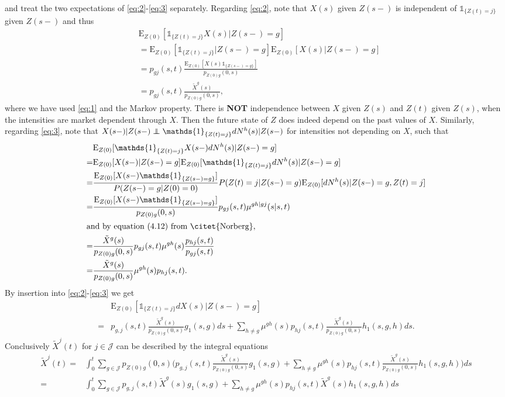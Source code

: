 \documentclass[12pt]{article}
\newcommand{\E}{\text{E}}
\newcommand{\indic}[1]{\mathds{1}_{ \{ #1 \} }}
\newcommand\independent{\protect\mathpalette{\protect\independenT}{\perp}}
\def\independenT#1#2{\mathrel{\rlap{$#1#2$}\mkern2mu{#1#2}}}
\begin{document}
and treat the two expectations of \eqref{eq:2}-\eqref{eq:3} separately. Regarding \eqref{eq:2}, note that $X(s)$ given $Z(s-)$ is independent of $\indic{Z(t)=j}$ given $Z(s-)$ and thus
\begin{align}
&\E_{Z(0)}[\indic{Z(t)=j}X(s)|Z(s-)=g] \nonumber
\\
&=\E_{Z(0)}[\indic{Z(t)=j}|Z(s-)=g] \E_{Z(0)}[ X(s)|Z(s-)=g] \label{eq:AAA}
\\
&=p_{gj}(s,t) \frac{\E_{Z(0)}[X(s)\indic{Z(s-)=g}]}{p_{Z(0)g}(0,s)} \nonumber
\\
&=p_{gj}(s,t) \frac{\tilde{X}^g(s)}{p_{Z(0)g}(0,s)} \nonumber,
\end{align}
where we have used \eqref{eq:1} and the Markov property. There is \textbf{NOT} independence between $X$ given $Z(s)$ and $Z(t)$ given $Z(s)$, when the intensities are market dependent through $X$. Then the future state of $Z$ does indeed depend on the past values of $X$. Similarly, regarding \eqref{eq:3}, note that $X(s-)|Z(s-) \independent \indic{Z(t)=j}dN^h(s)|Z(s-	)$ for intensities not depending on $X$, such that 
\begin{align}
&\E_{Z(0)}[ \indic{Z(t)=j}   X(s-) dN^h(s)|Z(s-)=g] \nonumber
\\
=&  \E_{Z(0)}[ X(s-) |Z(s-)=g] \E_{Z(0)}[ \indic{Z(t)=j} dN^h(s)|Z(s-)=g] \label{eq:AAB}
\\
=&
\frac{\E_{Z(0)}[ X(s-) \indic{Z(s-)=g}]}{P(Z(s-)=g|Z(0)=0)}P(Z(t)=j|Z(s-)=g)\E_{Z(0)}[dN^h(s)|Z(s-)=g,Z(t)=j] \nonumber
\\
=&
\frac{\E_{Z(0)}[ X(s-) \indic{Z(s-)=g}]}{p_{Z(0)g}(0,s)}p_{gj}(s,t) \mu^{gh|gj}(s|s,t)\nonumber
\\
\intertext{and by equation (4.12) from \citet{Norberg},}
=&
\frac{\tilde{X}^g(s)}{p_{Z(0)g}(0,s)}p_{gj}(s,t) \mu^{gh}(s)\frac{p_{hj}(s,t)}{p_{gj}(s,t)} \nonumber
\\
=&
\frac{\tilde{X}^g(s)}{p_{Z(0)g}(0,s)} \mu^{gh}(s)p_{hj}(s,t). \nonumber
\end{align}
By insertion into \eqref{eq:2}-\eqref{eq:3} we get
\begin{align*}
&\E_{Z(0)}[ \indic{Z(t)=j} dX(s)|Z(s-)=g ]
\\
=&
p_{g,j}(s,t) \frac{\tilde{X}^g(s)}{p_{Z(0)g}(0,s)} g_1(s,g)ds
+\sum_{h\neq g} \mu^{gh}(s) p_{hj}(s,t) \frac{\tilde{X}^g(s)}{p_{Z(0)g}(0,s)} h_1(s,g,h) ds.
\end{align*}
Conclusively $\tilde{X}^j(t)$ for $j\in\mathcal{J}$ can be described by the integral equations
\begin{align*}
\tilde{X}^j(t)=&
\int_0^t \sum_{g \in \mathcal{J}} p_{Z(0)g}(0,s) 
\bigg(
p_{g,j}(s,t) \frac{\tilde{X}^g(s)}{p_{Z(0)g}(0,s)} g_1(s,g)
+\sum_{h\neq g} \mu^{gh}(s) p_{hj}(s,t) \frac{\tilde{X}^g(s)}{p_{Z(0)g}(0,s)} h_1(s,g,h)
\bigg) ds
\\
=&
\int_0^t \sum_{g \in \mathcal{J}} p_{g,j}(s,t) \tilde{X}^g(s) g_1(s,g)
+\sum_{h\neq g} \mu^{gh}(s) p_{hj}(s,t) \tilde{X}^g(s) h_1(s,g,h) ds
\end{align*}
\end{document}
